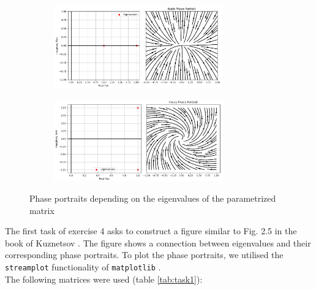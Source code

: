 \begin{figure}[H]\ContinuedFloat
    \centering
    \begin{subfigure}[b]{\textwidth}
        \centering
        \includegraphics[width=0.8\textwidth]{images/4-1-Node-unstable.png}
    \end{subfigure}
    \begin{subfigure}[b]{\textwidth}
        \centering
        \includegraphics[width=0.8\textwidth]{images/4-1-Focus-unstable.png}
    \end{subfigure}
    \caption{Phase portraits depending on the eigenvalues of the parametrized matrix}
    \label{fig:task1a}
\end{figure}

The first task of exercise 4 asks to construct a figure similar to Fig. 2.5 in the book of Kuznetsov \cite{kuznetsov}. The figure shows a connection between eigenvalues and their corresponding phase portraits. To plot the phase portraits, we utilised the \texttt{streamplot} functionality of \texttt{matplotlib} \cite{Hunter:2007}. \\


The following matrices were used (table \ref{tab:task1}): 

